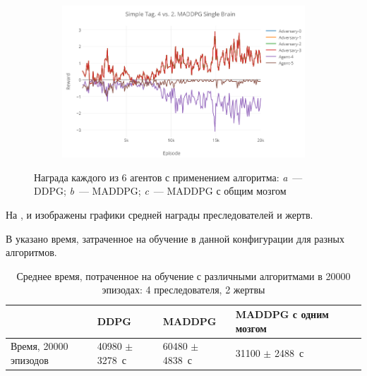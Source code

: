 \begin{figure}[!htbp]
    \begin{subfigure}[t]{\dimexpr.5\linewidth-1.3em\relax}%
        \includegraphics[height=0.20\textheight,valign=t]{my_folder/images/ch5/st-4vs2-maddpg-sb.png}%
    \end{subfigure}
    \captionsetup{justification=centering} %
    \caption{Награда каждого из 6 агентов с применением алгоритма: {\itshape a}~--- DDPG; {\itshape b}~--- MADDPG; {\itshape c}~--- MADDPG с общим мозгом}\label{fig:spbpu_main_bld-two-photos}
\end{figure}

На ,  и  изображены графики средней награды преследователей и жертв.

В  указано время, затраченное на обучение в данной конфигурации для разных алгоритмов.

\begin{table}[t!]
    \centering\small
    \caption{Среднее время, потраченное на обучение с различными алгоритмами в 20000 эпизодах: 4 преследователя, 2 жертвы}
    \label{tab-st-4vs2-time}
    \begin{tabular}{|l|l|l|l|l|l|}
        \hline
        & DDPG               & MADDPG             & MADDPG с одним мозгом \\
        \hline
        Время, 20000 эпизодов & 40980 $\pm$ 3278~с & 60480 $\pm$ 4838~с & 31100 $\pm$ 2488~с    \\ \hline
    \end{tabular}
    \normalsize%
\end{table}

